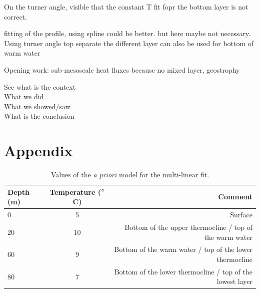 \documentclass[12pt,a4paper]{article}
\begin{document}
On the turner angle, visible that the constant T fit fopr the bottom layer is
not correct.

fitting of the profile, using spline could be better. but here maybe not necessary.
Using turner angle top separate the different layer can also be used for bottom
of warm water

Opening work: sub-mesoscale heat fluxes because no mixed layer, geostrophy

See what is the context\\
What we did\\
What we showed/saw\\
What is the conclusion





\newpage

\appendix

\section{Appendix}

\begin{table}[h]
  \centering
  \begin{tabular}{|l|c|r|}
    \hline
    Depth (m) & Temperature ($^{\circ}$C) & Comment \\
    \hline
    0 & 5 & Surface\\
    20 & 10 & Bottom of the upper thermocline / top of the warm water\\
    60 & 9 & Bottom of the warm water / top of the lower thermocline\\
    80 & 7 & Bottom of the lower thermocline / top of the lowest layer\\
    \hline
  \end{tabular}
  \caption{\label{tab:apriori}Values of the {\it a priori} model for the multi-linear fit.}
\end{table}
\end{document}
